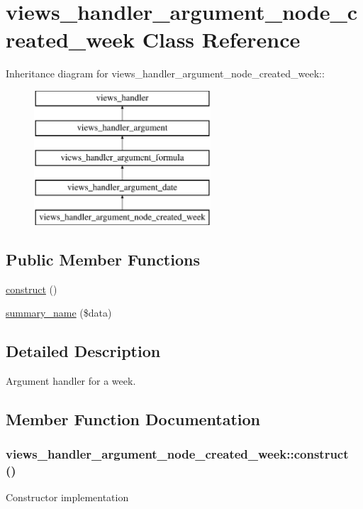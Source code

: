 \hypertarget{classviews__handler__argument__node__created__week}{
\section{views\_\-handler\_\-argument\_\-node\_\-created\_\-week Class Reference}
\label{classviews__handler__argument__node__created__week}
}
Inheritance diagram for views\_\-handler\_\-argument\_\-node\_\-created\_\-week::\begin{figure}[H]
\begin{center}
\leavevmode
\includegraphics[height=5cm]{classviews__handler__argument__node__created__week}
\end{center}
\end{figure}
\subsection*{Public Member Functions}
\begin{DoxyCompactItemize}
\item 
\hyperlink{classviews__handler__argument__node__created__week_ae90c3f8a723cfa081198075d2fe67c52}{construct} ()
\item 
\hyperlink{classviews__handler__argument__node__created__week_a12d7be7da978ed5571bb28a17b6b2805}{summary\_\-name} (\$data)
\end{DoxyCompactItemize}


\subsection{Detailed Description}
Argument handler for a week. 

\subsection{Member Function Documentation}
\hypertarget{classviews__handler__argument__node__created__week_ae90c3f8a723cfa081198075d2fe67c52}{
\subsubsection[{construct}]{\setlength{\rightskip}{0pt plus 5cm}views\_\-handler\_\-argument\_\-node\_\-created\_\-week::construct ()}}
\label{classviews__handler__argument__node__created__week_ae90c3f8a723cfa081198075d2fe67c52}
Constructor implementation 

